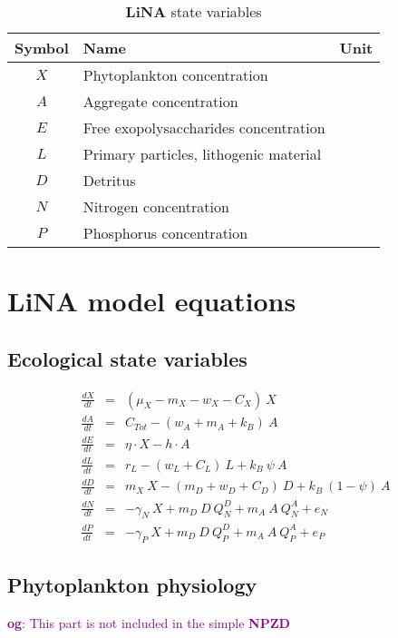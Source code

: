 \documentclass[fleqn]{article}                     %
\newcommand{\comment}[3][darkmagenta]{\textcolor{#1}{\textbf{#2}: #3}}
\newcommand{\LiNA}{\textbf{LiNA} }
\begin{document}
\begin{table}[h!]
  \centering
  \caption{\LiNA state variables}
  \begin{tabular}{cll}
  \hline
    \textbf{Symbol} & \textbf{Name} & \textbf{Unit}\\ \hline
    $X$ & Phytoplankton concentration & \\
    $A$ & Aggregate concentration & \\
    $E$ & Free exopolysaccharides concentration & \\
    $L$ & Primary particles, lithogenic material & \\
    $D$ & Detritus & \\
    $N$ & Nitrogen concentration & \\
    $P$ & Phosphorus concentration & \\
    \hline
  \end{tabular}
  \label{tab:stateVariables}
\end{table}


\section{\LiNA model equations}


\subsection{Ecological state variables}

\begin{eqnarray}
  \frac{dX}{dt} &=&  (\mu_X - m_X- w_X - C_X)\  X \\
  \frac{dA}{dt} &=&  C_{Tot} - (w_A + m_A + k_B) \ A\\
  \frac{dE}{dt} &=& \eta \cdot X - h\cdot A \\
  \frac{dL}{dt} &=& r_L - (w_L+C_L)\ L + k_B\ \psi\ A \\
  \frac{dD}{dt} &=& m_X \  X - (m_D + w_D + C_D)\ D + k_B\ (1-\psi)\ A \\
  \frac{dN}{dt} &=& -\gamma_N \ X + m_D\ D \  Q^D_N + m_A\ A\  Q^A_N + e_N\\
  \frac{dP}{dt} &=& -\gamma_P\  X + m_D\ D \  Q^D_P + m_A\ A\  Q^A_P + e_P
\end{eqnarray}


\subsection{Phytoplankton physiology}
\comment{og}{This part is not included in the simple \textbf{NPZD}}
\end{document}
